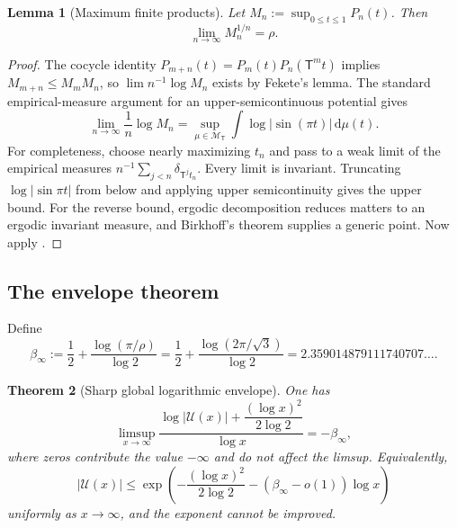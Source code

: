\documentclass[11pt,oneside]{article}
\newtheorem{theorem}{Theorem}[section]
\newtheorem{lemma}[theorem]{Lemma}
\theoremstyle{definition}
\theoremstyle{remark}
\newcommand{\dd}{\,\mathrm d}
\newcommand{\Uhat}{\mathcal U}
\newcommand{\T}{\mathsf T}
\begin{document}
\begin{lemma}[Maximum finite products]\label{lem:Mn}
Let $M_n:=\sup_{0\le t\le1}P_n(t)$.  Then
\begin{equation}\label{eq:Mn-limit}
 \lim_{n\to\infty}M_n^{1/n}=\rho.
\end{equation}
\end{lemma}

\begin{proof}
The cocycle identity
$P_{m+n}(t)=P_m(t)P_n(\T^mt)$ implies $M_{m+n}\le M_mM_n$, so
$\lim n^{-1}\log M_n$ exists by Fekete's lemma.  The standard empirical-measure
argument for an upper-semicontinuous potential gives
\[
 \lim_{n\to\infty}\frac1n\log M_n
 =\sup_{\mu\in\mathcal M_\T}
 \int\log|\sin(\pi t)|\dd\mu(t).
\]
For completeness, choose nearly maximizing $t_n$ and pass to a weak limit of the
empirical measures $n^{-1}\sum_{j<n}\delta_{\T^jt_n}$.  Every limit is invariant.
Truncating $\log|\sin\pi t|$ from below and applying upper semicontinuity gives the
upper bound.  For the reverse bound, ergodic decomposition reduces matters to an ergodic
invariant measure, and Birkhoff's theorem supplies a generic point.  Now apply
.
\end{proof}

\subsection{The envelope theorem}

Define
\begin{equation}\label{eq:beta-infty}
 \beta_\infty
 :=\frac12+\frac{\log(\pi/\rho)}{\log2}
 =\frac12+\frac{\log(2\pi/\sqrt3)}{\log2}
 =2.359014879111740707\ldots .
\end{equation}

\begin{theorem}[Sharp global logarithmic envelope]\label{thm:envelope}
One has
\begin{equation}\label{eq:global-limsup}
 \limsup_{x\to\infty}
 \frac{
 \log|\Uhat(x)|+\dfrac{(\log x)^2}{2\log2}}
 {\log x}
 =-\beta_\infty,
\end{equation}
where zeros contribute the value $-\infty$ and do not affect the limsup.
Equivalently,
\begin{equation}\label{eq:global-upper-o}
 |\Uhat(x)|\le
 \exp\!\left(-\frac{(\log x)^2}{2\log2}
 -(\beta_\infty-o(1))\log x\right)
\end{equation}
uniformly as $x\to\infty$, and the exponent cannot be improved.
\end{theorem}
\end{document}
